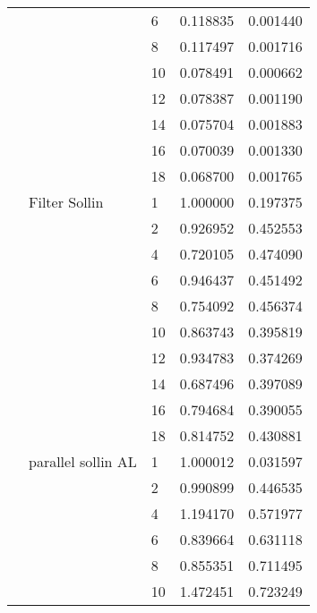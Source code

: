 \begin{tabular}{lllrr}
                      &                     & 6  &  0.118835 &  0.001440 \\
                      &                     & 8  &  0.117497 &  0.001716 \\
                      &                     & 10 &  0.078491 &  0.000662 \\
                      &                     & 12 &  0.078387 &  0.001190 \\
                      &                     & 14 &  0.075704 &  0.001883 \\
                      &                     & 16 &  0.070039 &  0.001330 \\
                      &                     & 18 &  0.068700 &  0.001765 \\
                      & Filter Sollin & 1  &  1.000000 &  0.197375 \\
                      &                     & 2  &  0.926952 &  0.452553 \\
                      &                     & 4  &  0.720105 &  0.474090 \\
                      &                     & 6  &  0.946437 &  0.451492 \\
                      &                     & 8  &  0.754092 &  0.456374 \\
                      &                     & 10 &  0.863743 &  0.395819 \\
                      &                     & 12 &  0.934783 &  0.374269 \\
                      &                     & 14 &  0.687496 &  0.397089 \\
                      &                     & 16 &  0.794684 &  0.390055 \\
                      &                     & 18 &  0.814752 &  0.430881 \\
                      & parallel sollin AL & 1  &  1.000012 &  0.031597 \\
                      &                     & 2  &  0.990899 &  0.446535 \\
                      &                     & 4  &  1.194170 &  0.571977 \\
                      &                     & 6  &  0.839664 &  0.631118 \\
                      &                     & 8  &  0.855351 &  0.711495 \\
                      &                     & 10 &  1.472451 &  0.723249 \\

\end{tabular}

